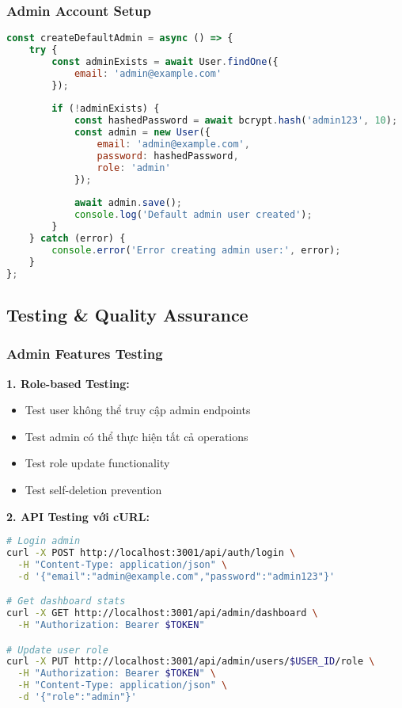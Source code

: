 \documentclass[12pt,a4paper]{article}
\begin{document}
\subsubsection{Admin Account Setup}

\begin{lstlisting}[language=JavaScript, caption=Auto-create Admin User]
const createDefaultAdmin = async () => {
    try {
        const adminExists = await User.findOne({ 
            email: 'admin@example.com' 
        });
        
        if (!adminExists) {
            const hashedPassword = await bcrypt.hash('admin123', 10);
            const admin = new User({
                email: 'admin@example.com',
                password: hashedPassword,
                role: 'admin'
            });
            
            await admin.save();
            console.log('Default admin user created');
        }
    } catch (error) {
        console.error('Error creating admin user:', error);
    }
};
\end{lstlisting}

\subsection{Testing \& Quality Assurance}

\subsubsection{Admin Features Testing}

\textbf{1. Role-based Testing:}
\begin{itemize}
    \item Test user không thể truy cập admin endpoints
    \item Test admin có thể thực hiện tất cả operations
    \item Test role update functionality
    \item Test self-deletion prevention
\end{itemize}

\textbf{2. API Testing với cURL:}
\begin{lstlisting}[language=bash, caption=Admin API Testing]
# Login admin
curl -X POST http://localhost:3001/api/auth/login \
  -H "Content-Type: application/json" \
  -d '{"email":"admin@example.com","password":"admin123"}'

# Get dashboard stats
curl -X GET http://localhost:3001/api/admin/dashboard \
  -H "Authorization: Bearer $TOKEN"

# Update user role
curl -X PUT http://localhost:3001/api/admin/users/$USER_ID/role \
  -H "Authorization: Bearer $TOKEN" \
  -H "Content-Type: application/json" \
  -d '{"role":"admin"}'
\end{lstlisting}
\end{document}

